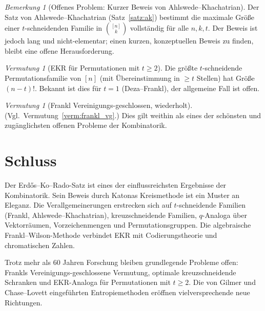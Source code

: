 \documentclass[12pt,a4paper]{amsart}
\theoremstyle{definition}
\theoremstyle{remark}
\newtheorem{vermutung}[theorem]{Vermutung}
\newtheorem{bemerkung}[theorem]{Bemerkung}
\begin{document}
\begin{bemerkung}[Offenes Problem: Kurzer Beweis von Ahlswede--Khachatrian]
\label{bem:t_klein_n}
Der Satz von Ahlswede--Khachatrian (Satz~\ref{satz:ak}) bestimmt die maximale
Größe einer $t$-schneidenden Familie in $\binom{[n]}{k}$ vollständig für alle
$n, k, t$. Der Beweis ist jedoch lang und nicht-elementar; einen kurzen, konzeptuellen
Beweis zu finden, bleibt eine offene Herausforderung.
\end{bemerkung}

\begin{vermutung}[EKR für Permutationen mit $t \geq 2$]\label{verm:ekr_perm}
Die größte $t$-schneidende Permutationsfamilie von $[n]$ (mit Übereinstimmung in
$\geq t$ Stellen) hat Größe $(n-t)!$. Bekannt ist dies für $t=1$ (Deza--Frankl),
der allgemeine Fall ist offen.
\end{vermutung}

\begin{vermutung}[Frankl Vereinigungs-geschlossen, wiederholt]
\label{verm:frankl_vg2}
(Vgl.\ Vermutung~\ref{verm:frankl_vg}.) Dies gilt weithin als eines der
schönsten und zugänglichsten offenen Probleme der Kombinatorik.
\end{vermutung}

\section{Schluss}

Der Erdős--Ko--Rado-Satz ist eines der einflussreichsten Ergebnisse der
Kombinatorik. Sein Beweis durch Katonas Kreismethode ist ein Muster an Eleganz.
Die Verallgemeinerungen erstrecken sich auf $t$-schneidende Familien
(Frankl, Ahlswede--Khachatrian), kreuzschneidende Familien, $q$-Analoga über
Vektorräumen, Vorzeichenmengen und Permutationsgruppen. Die algebraische
Frankl--Wilson-Methode verbindet EKR mit Codierungstheorie und chromatischen
Zahlen.

Trotz mehr als 60 Jahren Forschung bleiben grundlegende Probleme offen: Frankls
Vereinigungs-geschlossene Vermutung, optimale kreuzschneidende Schranken und
EKR-Analoga für Permutationen mit $t \geq 2$. Die von Gilmer und Chase--Lovett
eingeführten Entropiemethoden eröffnen vielversprechende neue Richtungen.
\end{document}
